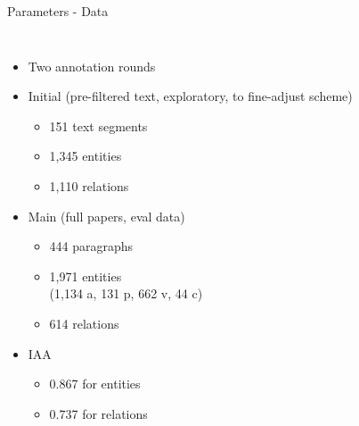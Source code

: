 \documentclass[en,16:9,smallfoot]{sdqbeamer}
\begin{document}
   \begin{frame}{Parameters - Data}
   \begin{columns}
           \begin{itemize}
               \item Two annotation rounds
               \item Initial (pre-filtered text, exploratory, to fine-adjust scheme)
               \begin{itemize}
                  \item 151 text segments
                  \item 1,345 entities
                  \item 1,110 relations
               \end{itemize}
               \item Main (full papers, eval data)
               \begin{itemize}
                  \item 444 paragraphs
                  \item 1,971 entities\\(1,134 a, 131 p, 662 v, 44 c)
                  \item 614 relations
               \end{itemize}
               \item IAA
               \begin{itemize}
                  \item 0.867 for entities
                  \item 0.737 for relations
               \end{itemize}
           \end{itemize}
            \begin{figure}
                \centering
\end{figure}
\end{columns}
\end{frame}
\end{document}
